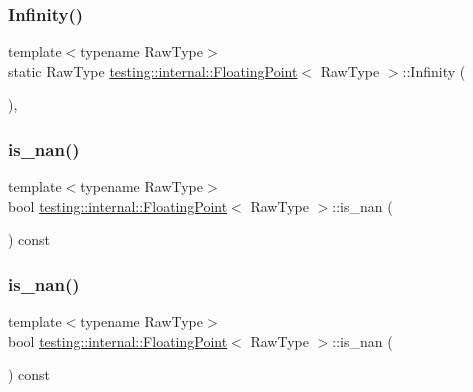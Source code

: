 \subsubsection{\texorpdfstring{Infinity()}{Infinity()}\hspace{0.1cm}{\footnotesize\ttfamily [3/3]}}
{\footnotesize\ttfamily template$<$typename Raw\+Type$>$ \\
static Raw\+Type \mbox{\hyperlink{classtesting_1_1internal_1_1_floating_point}{testing\+::internal\+::\+Floating\+Point}}$<$ Raw\+Type $>$\+::Infinity (\begin{DoxyParamCaption}{ }\end{DoxyParamCaption})\hspace{0.3cm}{\ttfamily [inline]}, {\ttfamily [static]}}

\mbox{\label{classtesting_1_1internal_1_1_floating_point_a1fc654fd206efa98e480aa1e034f30d5}} 
\subsubsection{\texorpdfstring{is\_nan()}{is\_nan()}\hspace{0.1cm}{\footnotesize\ttfamily [1/3]}}
{\footnotesize\ttfamily template$<$typename Raw\+Type$>$ \\
bool \mbox{\hyperlink{classtesting_1_1internal_1_1_floating_point}{testing\+::internal\+::\+Floating\+Point}}$<$ Raw\+Type $>$\+::is\+\_\+nan (\begin{DoxyParamCaption}{ }\end{DoxyParamCaption}) const\hspace{0.3cm}{\ttfamily [inline]}}

\mbox{\label{classtesting_1_1internal_1_1_floating_point_a1fc654fd206efa98e480aa1e034f30d5}} 
\subsubsection{\texorpdfstring{is\_nan()}{is\_nan()}\hspace{0.1cm}{\footnotesize\ttfamily [2/3]}}
{\footnotesize\ttfamily template$<$typename Raw\+Type$>$ \\
bool \mbox{\hyperlink{classtesting_1_1internal_1_1_floating_point}{testing\+::internal\+::\+Floating\+Point}}$<$ Raw\+Type $>$\+::is\+\_\+nan (\begin{DoxyParamCaption}{ }\end{DoxyParamCaption}) const\hspace{0.3cm}{\ttfamily [inline]}}

